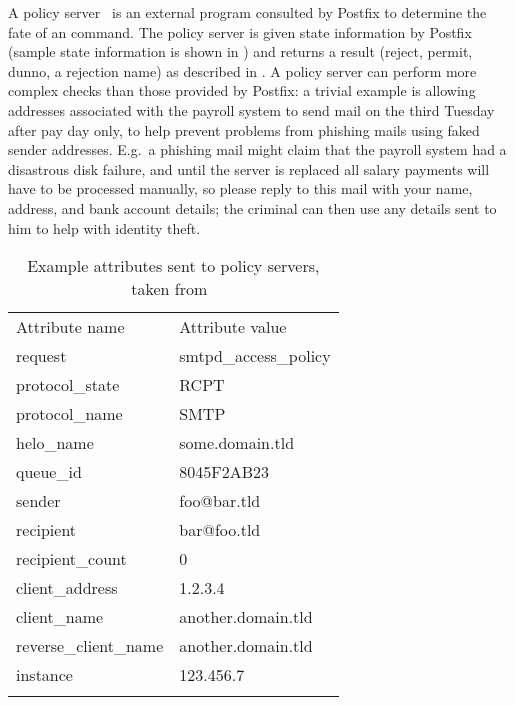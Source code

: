 \label{policy servers}

A policy server~\cite{policy-servers} is an external program consulted by
Postfix to determine the fate of an  command.  The policy
server is given state information by Postfix (sample state information is
shown in ) and returns
a result (reject, permit, dunno, a rejection name) as described in
.  A policy server can
perform more complex checks than those provided by Postfix: a trivial
example is allowing addresses associated with the payroll system to send
mail on the third Tuesday after pay day only, to help prevent problems from
phishing mails using faked sender addresses.  E.g.\ a phishing mail might
claim that the payroll system had a disastrous disk failure, and until the
server is replaced all salary payments will have to be processed manually,
so please reply to this mail with your name, address, and bank account
details; the criminal can then use any details sent to him to help with
identity theft.

\begin{table}[thbp]
    \caption{Example attributes sent to policy servers, taken
    from~\cite{policy-servers}}
    \empty{}\label{Example attributes sent to policy servers}
    \centering{}
    \begin{tabular}[]{ll}
        \tabletopline{}%
        Attribute name          & Attribute value           \\
        \tablemiddleline{}%
        request                 & smtpd\_access\_policy     \\
        protocol\_state         & RCPT                      \\
        protocol\_name          & SMTP                      \\
        helo\_name              & some.domain.tld           \\
        queue\_id               & 8045F2AB23                \\
        sender                  & foo@bar.tld               \\
        recipient               & bar@foo.tld               \\
        recipient\_count        & 0                         \\
        client\_address         & 1.2.3.4                   \\
        client\_name            & another.domain.tld        \\
        reverse\_client\_name   & another.domain.tld        \\
        instance                & 123.456.7                 \\
        \tablebottomline{}%
    \end{tabular}
\end{table}

